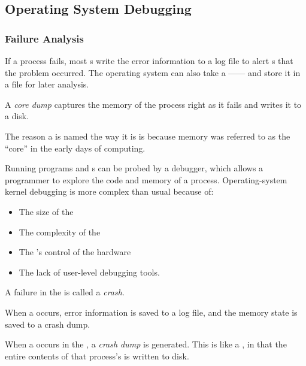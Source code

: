 \subsection{Operating System Debugging}\label{subsec:OS_Debugging}
\subsubsection{Failure Analysis}\label{subsubsec:Failure_Analysis}
If a process fails, most s write the error information to a log file to alert s that the problem occurred.
The operating system can also take a —— and store it in a file for later analysis.

\begin{definition}\label{def:Core_Dump}
  A \emph{core dump} captures the memory of the process right as it fails and writes it to a disk.

  \begin{remark}\label{rmk:Why_Core_Dump}
    The reason a  is named the way it is is because memory was referred to as the ``core'' in the early days of computing.
  \end{remark}
\end{definition}

Running programs and s can be probed by a debugger, which allows a programmer to explore the code and memory of a process.
Operating-system kernel debugging is more complex than usual because of:
\begin{itemize}[noitemsep]
\item The size of the 
\item The complexity of the 
\item The 's control of the hardware
\item The lack of user-level debugging tools.
\end{itemize}


\begin{definition}[Crash]\label{def:Crash}
  A failure in the  is called a \emph{crash}.
\end{definition}

When a  occurs, error information is saved to a log file, and the memory state is saved to a crash dump.

\begin{definition}\label{def:Crash_Dump}
  When a  occurs in the , a \emph{crash dump} is generated.
  This is like a , in that the entire contents of that process's  is written to disk.
\end{definition}

